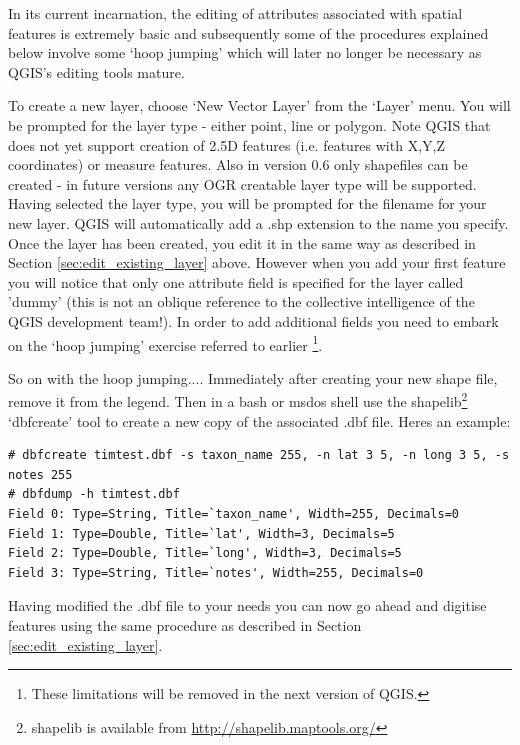In its current incarnation, the editing of attributes associated with spatial features is extremely basic and subsequently some of the procedures explained below involve some `hoop jumping' which will later no longer be necessary as QGIS's editing tools mature.

To create a new layer, choose `New Vector Layer' from the `Layer' menu. You will be prompted for the layer type - either point, line or polygon. Note QGIS that does not yet support creation of 2.5D features (i.e. features with X,Y,Z coordinates) or measure features. Also in version 0.6 only shapefiles can be created - in future versions any OGR creatable layer type will be supported. Having selected the layer type, you will be prompted for the filename for your new layer. QGIS will automatically add a .shp extension to the name you specify. Once the layer has been created, you edit it in the same way as described in Section \ref{sec:edit_existing_layer} above. However when you add your first feature you will notice that only one attribute field is specified for the layer called 'dummy' (this is not an oblique reference to the collective intelligence of the QGIS development team!). In order to add additional fields you need to embark on the `hoop jumping' exercise referred to earlier \footnote{These limitations will be removed in the next version of QGIS.}. 

So on with the hoop jumping.... Immediately after creating your new shape file, remove it from the legend. Then in a bash or msdos shell use the shapelib\footnote{shapelib is available from \url{http://shapelib.maptools.org/}} `dbfcreate' tool to create a new copy of the associated .dbf file. Heres an example:


\begin{verbatim}
# dbfcreate timtest.dbf -s taxon_name 255, -n lat 3 5, -n long 3 5, -s notes 255
# dbfdump -h timtest.dbf
Field 0: Type=String, Title=`taxon_name', Width=255, Decimals=0
Field 1: Type=Double, Title=`lat', Width=3, Decimals=5
Field 2: Type=Double, Title=`long', Width=3, Decimals=5
Field 3: Type=String, Title=`notes', Width=255, Decimals=0

\end{verbatim} 

Having modified the .dbf file to your needs you can now go ahead and digitise features using the same procedure as described in Section \ref{sec:edit_existing_layer}.